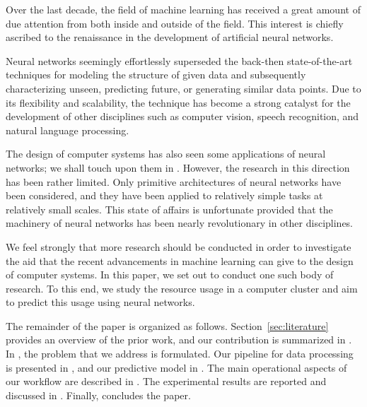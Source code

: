 Over the last decade, the field of machine learning has received a great amount
of due attention from both inside and outside of the field. This interest is
chiefly ascribed to the renaissance in the development of artificial neural
networks.

Neural networks seemingly effortlessly superseded the back-then state-of-the-art
techniques for modeling the structure of given data and subsequently
characterizing unseen, predicting future, or generating similar data points. Due
to its flexibility and scalability, the technique has become a strong catalyst
for the development of other disciplines such as computer vision, speech
recognition, and natural language processing.

The design of computer systems has also seen some applications of neural
networks; we shall touch upon them in . However, the research
in this direction has been rather limited. Only primitive architectures of
neural networks have been considered, and they have been applied to relatively
simple tasks at relatively small scales. This state of affairs is unfortunate
provided that the machinery of neural networks has been nearly revolutionary in
other disciplines.

We feel strongly that more research should be conducted in order to investigate
the aid that the recent advancements in machine learning can give to the design
of computer systems. In this paper, we set out to conduct one such body of
research. To this end, we study the resource usage in a computer cluster and aim
to predict this usage using neural networks.

The remainder of the paper is organized as follows. Section~\ref{sec:literature}
provides an overview of the prior work, and our contribution is summarized in
. In , the problem that we address is
formulated. Our pipeline for data processing is presented in , and
our predictive model in . The main operational aspects of our
workflow are described in . The experimental results are
reported and discussed in . Finally,  concludes
the paper.
